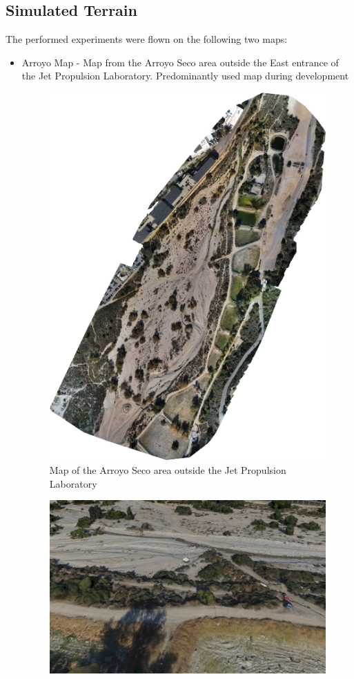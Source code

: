 \subsection{Simulated Terrain}\label{subsec:terrain}
The performed experiments were flown on the following two maps:
\begin{itemize}
    \item Arroyo Map - Map from the Arroyo Seco area outside the East entrance of the Jet Propulsion Laboratory. Predominantly used map during development
    \begin{figure}[h]
        \centering
        \includegraphics[scale=0.5]{images/evaluation/arroyo.png}
        \caption{Map of the Arroyo Seco area outside the Jet Propulsion Laboratory}
    \end{figure}
    \begin{figure}[h]
        \centering
        \includegraphics[scale=0.23]{images/evaluation/arroyo_map.png}

\end{figure}
\end{itemize}
